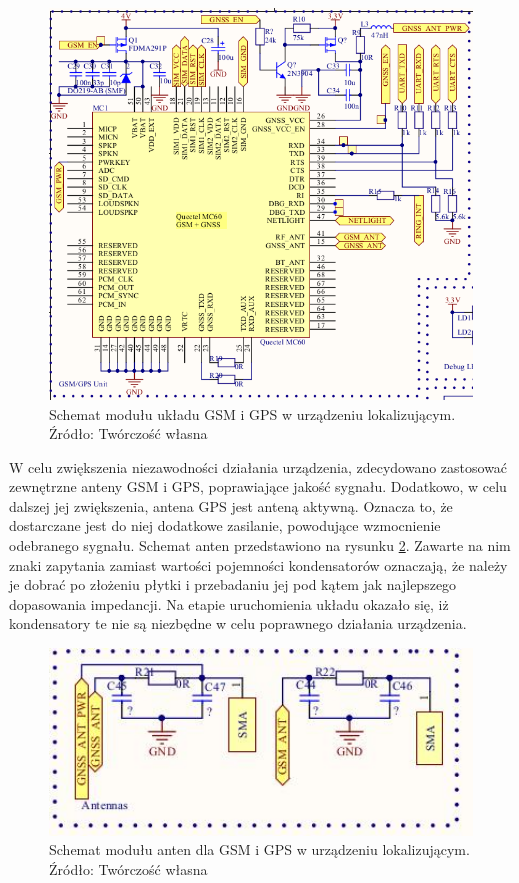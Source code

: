 \begin{figure}[H]
	\centering
	\includegraphics[width=15cm]{img/schematics/mainboard_gps_fixed.png}
	\caption{Schemat modułu układu GSM i GPS w urządzeniu lokalizującym. \\ Źródło: Twórczość własna}
	\label{fig:image_mainboard_functional_gps_gsm}
\end{figure}

W celu zwiększenia niezawodności działania urządzenia, zdecydowano zastosować zewnętrzne anteny GSM i GPS, poprawiające jakość sygnału. Dodatkowo, w celu dalszej jej zwiększenia, antena GPS jest anteną aktywną. Oznacza to, że dostarczane jest do niej dodatkowe zasilanie, powodujące wzmocnienie odebranego sygnału. Schemat anten przedstawiono na rysunku \ref{fig:image_mainboard_functional_gps_gsm_antennas}. Zawarte na nim znaki zapytania zamiast wartości pojemności kondensatorów oznaczają, że należy je dobrać po złożeniu płytki i przebadaniu jej pod kątem jak najlepszego dopasowania impedancji. Na etapie uruchomienia układu okazało się, iż kondensatory te nie są niezbędne w celu poprawnego działania urządzenia.

\begin{figure}[H]
	\centering
	\includegraphics[width=15cm]{img/schematics/mainboard_functional_gps_gsm_antennas.jpg}
	\caption{Schemat modułu anten dla GSM i GPS w urządzeniu lokalizującym. \\ Źródło: Twórczość własna}
	\label{fig:image_mainboard_functional_gps_gsm_antennas}
\end{figure}

